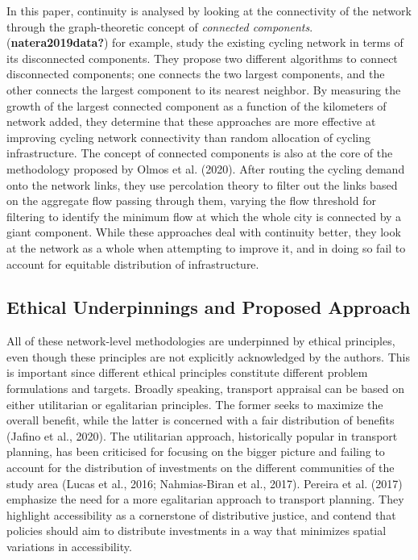 \documentclass[
]{article}
\begin{document}
In this paper, continuity is analysed by looking at the connectivity of
the network through the graph-theoretic concept of \emph{connected
components}. (\textbf{natera2019data?}) for example,
study the existing cycling network in terms of its disconnected
components. They propose two different algorithms to connect disconnected components; one connects the two largest components, and the other connects the largest component to its nearest neighbor. By measuring the growth of the largest connected component as a function of the kilometers of network added, they determine that these approaches are more effective at improving cycling network connectivity than random allocation of cycling infrastructure.
The concept of connected components is
also at the core of the methodology proposed by Olmos et al. (2020). After
routing the cycling demand onto the network links, they use percolation
theory to filter out the links based on the aggregate flow passing through them, varying the flow threshold for
filtering to identify the minimum flow at which the whole city is
connected by a giant component. While these approaches deal with
continuity better, they look at the network as a whole when attempting
to improve it, and in doing so fail to account for equitable
distribution of infrastructure.

\hypertarget{ethical-underpinnings-and-proposed-approach}{%
\subsection{Ethical Underpinnings and Proposed Approach}\label{ethical-underpinnings-and-proposed-approach}}

All of these network-level methodologies are underpinned by ethical
principles, even though these principles are not explicitly acknowledged
by the authors. This is important since different ethical principles
constitute different problem formulations and targets. Broadly speaking,
transport appraisal can be based on either utilitarian or egalitarian
principles. The former seeks to maximize the overall benefit, while the
latter is concerned with a fair distribution of benefits
(Jafino et al., 2020).
The utilitarian approach, historically popular in transport planning, has been criticised for focusing on the bigger picture and failing to account for the distribution of investments on the different communities of the study area (Lucas et al., 2016; Nahmias-Biran et al., 2017).
Pereira et al. (2017) emphasize the need for a more
egalitarian approach to transport planning. They highlight accessibility
as a cornerstone of distributive justice, and contend that policies
should aim to distribute investments in a way that minimizes spatial
variations in accessibility.
\end{document}
